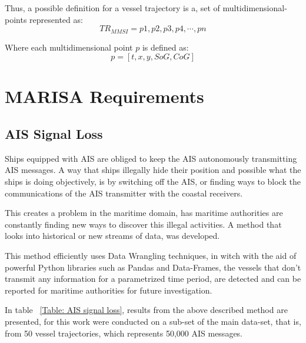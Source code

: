 Thus, a possible definition for a vessel trajectory is a, set of multidimensional-points represented as:
\[TR_{MMSI} = p1, p2, p3, p4, \cdots , pn\]

Where each multidimensional point $p$ is defined as:
\[p = [t, x, y, SoG, CoG]\]





\section{MARISA Requirements}
\subsection{AIS Signal Loss}
Ships equipped with AIS are obliged to keep the AIS autonomously transmitting AIS messages. A way that ships illegally hide their position and possible what the ships is doing objectively, is by switching off the AIS, or finding ways to block the communications of the AIS transmitter with the coastal receivers.

This creates a problem in the maritime domain, has maritime authorities are constantly finding new ways to discover this illegal activities. A method that looks into historical or new streams of data, was developed. 

This method efficiently uses Data Wrangling techniques, in witch with the aid of powerful Python libraries such as Pandas and Data-Frames, the vessels that don't transmit any information for a parametrized time period, are detected and can be reported for maritime authorities for future investigation.

In table ~\ref{Table: AIS signal loss}, results from the above described method are presented, for this work were conducted on a sub-set of the main data-set, that is, from 50 vessel trajectories, which represents 50,000 AIS messages.

